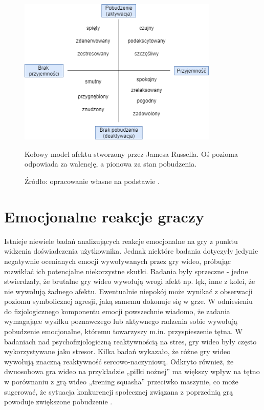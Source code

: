 \begin{figure}[h]
	\centering
	\includegraphics[width=0.85\textwidth]{images/diagram2.png}
	\caption{Kołowy model afektu stworzony przez Jamesa Russella. Oś pozioma odpowiada za walencję, a pionowa za stan pobudzenia.}
	\caption*{Źródło: opracowanie własne na podstawie \citep[s.1]{colors}.}
	\label{fig:spectrum}
\end{figure}


\section{Emocjonalne reakcje graczy}

Istnieje niewiele badań analizujących reakcje emocjonalne na gry z punktu widzenia doświadczenia użytkownika. Jednak niektóre badania dotyczyły jedynie negatywnie ocenianych emocji wywoływanych przez gry wideo, próbując rozwikłać ich potencjalne niekorzystne skutki. Badania były sprzeczne - jedne stwierdzały, że brutalne gry wideo wywołują wrogi afekt np. lęk, inne z kolei, że nie wywołują żadnego afektu. Ewentualnie niepokój może wynikać z obserwacji poziomu symbolicznej agresji, jaką samemu dokonuje się w grze. W odniesieniu do fizjologicznego komponentu emocji powszechnie wiadomo, że zadania wymagające wysiłku poznawczego lub aktywnego radzenia sobie wywołują pobudzenie emocjonalne, któremu towarzyszy m.in. przyspieszenie tętna. W badaniach nad psychofizjologiczną reaktywnością na stres, gry wideo były często wykorzystywane jako stresor. Kilka badań wykazało, że różne gry wideo wywołują znaczną reaktywność sercowo-naczyniową. Odkryto również, że dwuosobowa gra wideo na przykładzie „piłki nożnej” ma większy wpływ na tętno w porównaniu z grą wideo „trening squasha” przeciwko maszynie, co może sugerować, że sytuacja konkurencji społecznej związana z poprzednią grą powoduje zwiększone pobudzenie \citep{games}.


